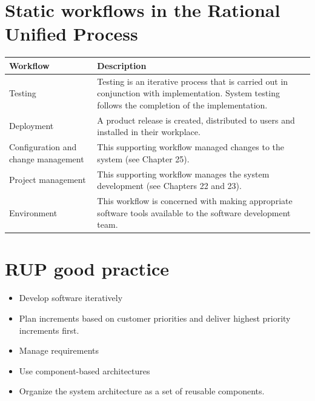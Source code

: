 \section{Static workflows in the Rational Unified Process}
\begin{table}[h!]
\centering
\begin{tabular}{ |p{3cm}|p{7cm}|  }
\hline
Workflow & Description  \\
\hline
Testing & Testing is an iterative process that is carried out in conjunction with implementation. System testing follows the completion of the implementation.\\
\hline
Deployment & A product release is created, distributed to users and installed in their workplace. \\
\hline
Configuration	and change management & This supporting workflow managed changes to the system (see Chapter 25). \\
\hline
Project management & This supporting workflow manages the system development (see Chapters 22 and 23). \\
\hline
Environment & This workflow is concerned with making appropriate software tools available to the software development team. \\
\hline
\end{tabular}

\label{table:T1_2}
\end{table}

\section{RUP good practice}
\begin{itemize}

\item Develop software iteratively

\item Plan increments based on customer priorities and deliver highest priority increments first.

\item Manage requirements
\item Use component-based architectures

\item Organize the system architecture as a set of reusable components.
\end{itemize}

